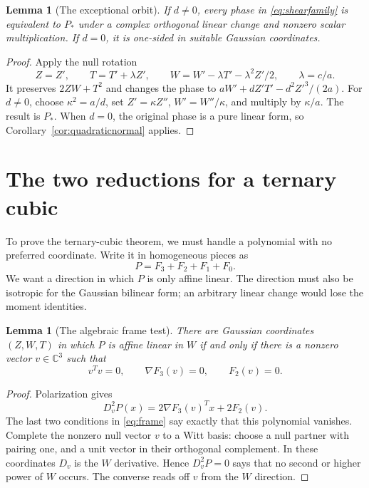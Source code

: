\documentclass[11pt]{article}
\newtheorem{lemma}[theorem]{Lemma}
\theoremstyle{definition}\newtheorem{definition}[theorem]{Definition}
\theoremstyle{remark}\newtheorem{remark}[theorem]{Remark}
\newcommand{\C}{\mathbb C}
\begin{document}
\begin{lemma}[The exceptional orbit]\label{lem:exceptionalorbit}
If $d\ne0$, every phase in \eqref{eq:shearfamily} is equivalent to
$P_*$ under a complex orthogonal linear change and nonzero scalar
multiplication. If $d=0$, it is one-sided in suitable Gaussian coordinates.
\end{lemma}
\begin{proof}
Apply the null rotation
\[
 Z=Z',\qquad T=T'+\lambda Z',\qquad
 W=W'-\lambda T'-\lambda^2Z'/2,\qquad \lambda=c/a.
\]
It preserves $2ZW+T^2$ and changes the phase to
$aW'+dZ'T'-d^2Z'^3/(2a)$. For $d\ne0$, choose
$\kappa^2=a/d$, set $Z'=\kappa Z''$, $W'=W''/\kappa$, and
multiply by $\kappa/a$. The result is $P_*$. When $d=0$, the
original phase is a pure linear form, so
Corollary~\ref{cor:quadraticnormal} applies.
\end{proof}

\section{The two reductions for a ternary cubic}\label{sec:cubic}

To prove the ternary-cubic theorem, we must handle a polynomial with no
preferred coordinate. Write it in homogeneous pieces as
\[
 P=F_3+F_2+F_1+F_0.
\]
We want a direction in which $P$ is only affine linear. The direction
must also be isotropic for the Gaussian bilinear form; an arbitrary
linear change would lose the moment identities.

\begin{lemma}[The algebraic frame test]\label{lem:frame}
There are Gaussian coordinates $(Z,W,T)$ in which $P$ is affine linear
in $W$ if and only if there is a nonzero vector $v\in\C^3$ such that
\begin{equation}\label{eq:frame}
 v^Tv=0,\qquad \nabla F_3(v)=0,\qquad F_2(v)=0.
\end{equation}
\end{lemma}
\begin{proof}
Polarization gives
\[
 D_v^2P(x)=2\nabla F_3(v)^Tx+2F_2(v).
\]
The last two conditions in \eqref{eq:frame} say exactly that this
polynomial vanishes. Complete the nonzero null vector $v$ to a Witt
basis: choose a null partner with pairing one, and a unit vector in
their orthogonal complement. In these coordinates $D_v$ is the $W$
derivative. Hence $D_v^2P=0$ says that no second or higher power of
$W$ occurs. The converse reads off $v$ from the $W$ direction.
\end{proof}
\end{document}
